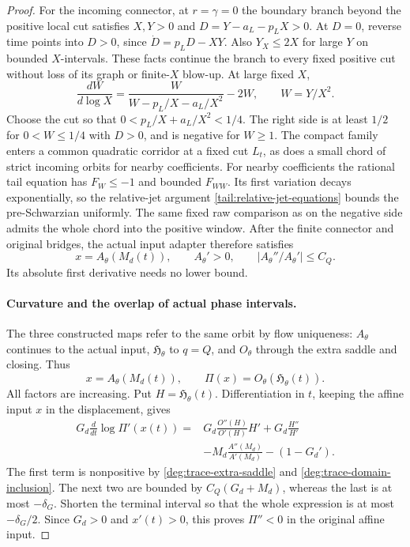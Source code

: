 \begin{proof}
For the incoming connector, at \(r=\gamma=0\) the boundary branch
beyond the positive local cut satisfies \(X,Y>0\) and
\(D=Y-a_L-p_LX>0\).  At \(D=0\), reverse time points into
\(D>0\), since \(\dot D=p_LD-XY\).  Also \(Y_X\le2X\)
for large \(Y\) on bounded \(X\)-intervals.  These facts continue
the branch to every fixed positive cut without loss of its graph
or finite-\(X\) blow-up.  At large fixed \(X\),
\[
 \frac{dW}{d\log X}=\frac{W}{W-p_L/X-a_L/X^2}-2W,
 \qquad W=Y/X^2.
\]
Choose the cut so that \(0<p_L/X+a_L/X^2<1/4\).  The right
side is at least \(1/2\) for \(0<W\le1/4\) with \(D>0\),
and is negative for \(W\ge1\).  The compact family enters a
common quadratic corridor at a fixed cut \(L_t\), as does a small
chord of strict incoming orbits for nearby coefficients.
For nearby coefficients the rational tail equation has
\(F_W\le-1\) and bounded \(F_{WW}\). Its first variation decays
exponentially, so the relative-jet argument
\eqref{tail:relative-jet-equations} bounds the pre-Schwarzian uniformly.
The same fixed raw comparison as on the negative side admits the whole
chord into the positive window. After the finite connector and original
bridges, the actual input adapter therefore satisfies
\begin{equation}\label{deg:trace-input-adapter}
 x=A_\theta(M_d(t)),\qquad A_\theta'>0,\qquad
 |A_\theta''/A_\theta'|\le C_Q.
\end{equation}
Its absolute first derivative needs no lower bound.

\paragraph{Curvature and the overlap of actual phase intervals.}
The three constructed maps refer to the same orbit by flow uniqueness:
\(A_\theta\) continues to the actual input, \(\mathfrak H_\theta\)
to \(q=Q\), and \(O_\theta\) through the extra saddle and closing.
Thus
\[
 x=A_\theta(M_d(t)),\qquad \Pi(x)=O_\theta(\mathfrak H_\theta(t)).
\]
All factors are increasing. Put \(H=\mathfrak H_\theta(t)\).
Differentiation in \(t\), keeping the
affine input \(x\) in the displacement, gives
\begin{equation}\label{deg:trace-composition}
 \begin{split}
 G_d\frac{d}{dt}\log\Pi'(x(t))
 ={}&G_d\frac{O''(H)}{O'(H)}H'+G_d\frac{H''}{H'}\\
 &-M_d\frac{A''(M_d)}{A'(M_d)}-(1-G_d').
 \end{split}
\end{equation}
The first term is nonpositive by \eqref{deg:trace-extra-saddle}
and \eqref{deg:trace-domain-inclusion}.  The next two are bounded
by \(C_Q(G_d+M_d)\), whereas the last is at most \(-\delta_G\).
Shorten the terminal interval so that the whole expression is at
most \(-\delta_G/2\).  Since \(G_d>0\) and \(x'(t)>0\),
this proves \(\Pi''<0\) in the original affine input.


\end{proof}
